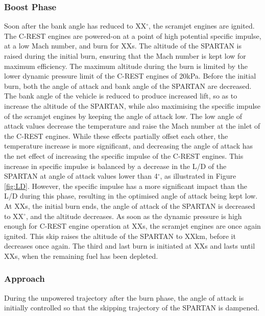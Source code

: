 \subsubsection{ Boost Phase}
Soon after the bank angle has reduced to XX$^\circ$, the scramjet engines are ignited. The C-REST engines are powered-on at a point of high potential specific impulse, at a low Mach number, and burn for XXs. The altitude of the SPARTAN is raised during the initial burn, ensuring that the Mach number is kept low for maximum efficiency. The maximum altitude during the burn is limited by the lower dynamic pressure limit of the C-REST engines of 20kPa.  Before the initial burn, both the angle of attack and bank angle of the SPARTAN are decreased. The bank angle of the vehicle is reduced to produce increased lift, so as to increase the altitude of the SPARTAN, while also maximising the specific impulse of the scramjet engines by keeping the angle of attack low. The low angle of attack values decrease the temperature and raise the Mach number at the inlet of the C-REST engines. While these effects partially offset each other\cite{Preller2017}, the temperature increase is more significant, and decreasing the angle of attack has the net effect of increasing the specific impulse of the C-REST engines. This increase in specific impulse is balanced by a decrease in the L/D of the SPARTAN at angle of attack values lower than 4$^\circ$, as illustrated in Figure \ref{fig:LD}. However, the specific impulse has a more significant impact than the L/D during this phase, resulting in the optimised angle of attack being kept low. 
At XXs, the initial burn ends, the angle of attack of the SPARTAN is decreased to XX$^\circ$, and the altitude decreases. As soon as the dynamic pressure is high enough for C-REST engine operation at XXs, the scramjet engines are once again ignited.
This skip raises the altitude of the SPARTAN to XXkm, before it decreases once again. 
The third and last burn is initiated at XXs and lasts until XXs, when the remaining fuel has been depleted. 



\subsubsection{ Approach}

During the unpowered trajectory after the burn phase, the angle of attack is initially controlled so that the skipping trajectory of the SPARTAN is dampened.

